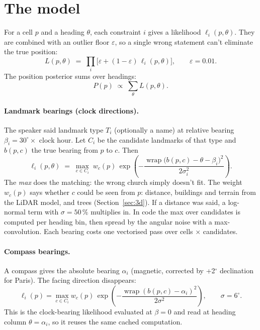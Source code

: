 \section{The model}

For a cell $p$ and a heading $\theta$, each constraint $i$ gives a likelihood $\ell_i(p,\theta)$. They
are combined with an outlier floor $\varepsilon$, so a single wrong statement can't eliminate the true
position:
\begin{equation}
  L(p,\theta) \;=\; \prod_i \Big[\varepsilon + (1-\varepsilon)\,\ell_i(p,\theta)\Big],
  \qquad \varepsilon = 0.01 .
\end{equation}
The position posterior sums over headings:
\begin{equation}
  P(p) \;\propto\; \sum_{\theta} L(p,\theta).
\end{equation}

\paragraph{Landmark bearings (clock directions).} The speaker said landmark type $T_i$ (optionally a
name) at relative bearing $\beta_i = 30^\circ \times$ clock hour. Let $C_i$ be the candidate landmarks
of that type and $b(p,c)$ the true bearing from $p$ to $c$. Then
\begin{equation}
  \ell_i(p,\theta) \;=\; \max_{c \in C_i}\; w_c(p)\,
  \exp\!\left(-\frac{\operatorname{wrap}\big(b(p,c) - \theta - \beta_i\big)^2}{2\sigma_i^2}\right).
\end{equation}
The \emph{max} does the matching: the wrong church simply doesn't fit. The weight $w_c(p)$ says whether
$c$ could be seen from $p$: distance, buildings and terrain from the LiDAR model, and trees
(Section~\ref{sec:3d}). If a distance was said, a log-normal term with $\sigma = 50\,\%$ multiplies in. In code
the max over candidates is computed per heading bin, then spread by the angular noise with a
max-convolution. Each bearing costs one vectorised pass over cells $\times$ candidates.

\paragraph{Compass bearings.} A compass gives the absolute bearing $\alpha_i$ (magnetic, corrected by
+2$^\circ$ declination for Paris). The facing direction disappears:
\begin{equation}
  \ell_i(p) = \max_{c \in C_i} w_c(p)\,\exp\!\left(-\frac{\operatorname{wrap}(b(p,c) - \alpha_i)^2}{2\sigma^2}\right),
  \qquad \sigma = 6^\circ .
\end{equation}
This is the clock-bearing likelihood evaluated at $\beta=0$ and read at heading column $\theta=\alpha_i$,
so it reuses the same cached computation.


